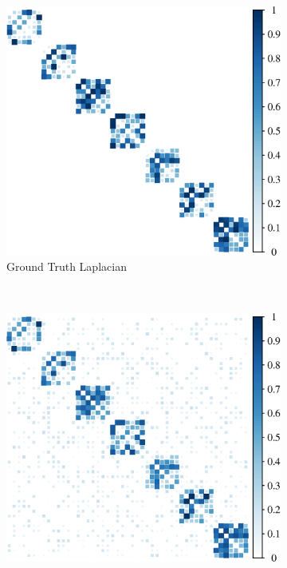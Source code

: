 \begin{figure}[!htb]
    \centering
    \begin{subfigure}[b]{0.3\textwidth}
        \includegraphics[width=\textwidth]{model-mismatch/true_mat.eps}
        \caption{Ground Truth Laplacian}
    \end{subfigure}
    ~ %
    \begin{subfigure}[b]{0.3\textwidth}
        \includegraphics[width=\textwidth]{model-mismatch/noisy_mat.eps}

\end{subfigure}
\end{figure}
